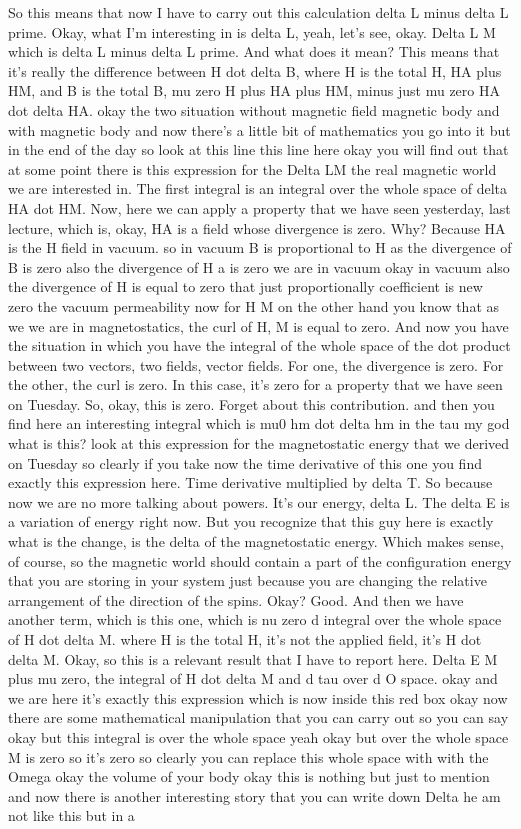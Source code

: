 So this means that now I have to carry out this calculation delta L minus delta L prime. Okay, what I'm interesting in is delta L, yeah, let's see, okay. Delta L M which is delta L minus delta L prime. And what does it mean? This means that it's really the difference between H dot delta B, where H is the total H, HA plus HM, and B is the total B, mu zero H plus HA plus HM, minus just mu zero HA dot delta HA. okay the two situation without magnetic field magnetic body and with magnetic body and now there's a little bit of mathematics you go into it but in the end of the day so look at this line this line here okay you will find out that at some point there is this expression for the Delta LM the real magnetic world we are interested in. The first integral is an integral over the whole space of delta HA dot HM. Now, here we can apply a property that we have seen yesterday, last lecture, which is, okay, HA is a field whose divergence is zero. Why? Because HA is the H field in vacuum. so in vacuum B is proportional to H as the divergence of B is zero also the divergence of H a is zero we are in vacuum okay in vacuum also the divergence of H is equal to zero that just proportionally coefficient is new zero the vacuum permeability now for H M on the other hand you know that as we we are in magnetostatics, the curl of H, M is equal to zero. And now you have the situation in which you have the integral of the whole space of the dot product between two vectors, two fields, vector fields. For one, the divergence is zero. For the other, the curl is zero. In this case, it's zero for a property that we have seen on Tuesday. So, okay, this is zero. Forget about this contribution. and then you find here an interesting integral which is mu0 hm dot delta hm in the tau my god what is this? look at this expression for the magnetostatic energy that we derived on Tuesday so clearly if you take now the time derivative of this one you find exactly this expression here. Time derivative multiplied by delta T. So because now we are no more talking about powers. It's our energy, delta L. The delta E is a variation of energy right now. But you recognize that this guy here is exactly what is the change, is the delta of the magnetostatic energy. Which makes sense, of course, so the magnetic world should contain a part of the configuration energy that you are storing in your system just because you are changing the relative arrangement of the direction of the spins. Okay? Good. And then we have another term, which is this one, which is nu zero d integral over the whole space of H dot delta M. where H is the total H, it's not the applied field, it's H dot delta M. Okay, so this is a relevant result that I have to report here. Delta E M plus mu zero, the integral of H dot delta M and d tau over d O space. okay and we are here it's exactly this expression which is now inside this red box okay now there are some mathematical manipulation that you can carry out so you can say okay but this integral is over the whole space yeah okay but over the whole space M is zero so it's zero so clearly you can replace this whole space with with the Omega okay the volume of your body okay this is nothing but just to mention and now there is another interesting story that you can write down Delta he am not like this but in a 